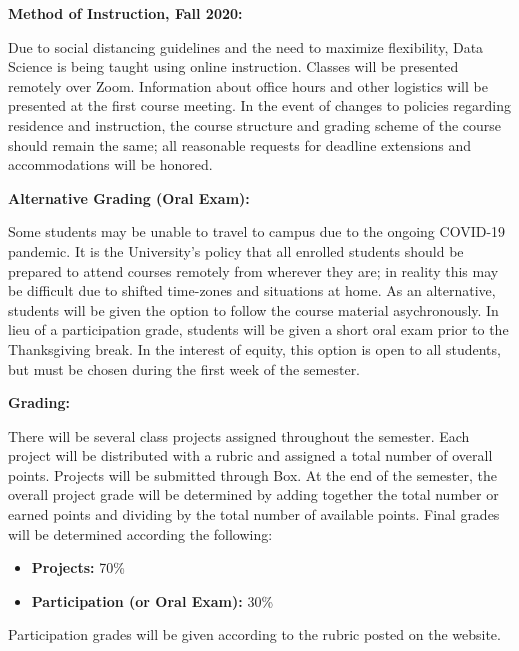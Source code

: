 \documentclass[12pt, a4paper]{article}
\begin{document}
\textbf{Method of Instruction, Fall 2020:} \vspace{6pt}

Due to social distancing guidelines and the need to maximize flexibility, Data Science is
being taught using online instruction. Classes will be presented remotely over Zoom.
Information about office hours and other logistics will be presented at the first course
meeting. In the event of changes to policies regarding residence and instruction, the
course structure and grading scheme of the course should remain the same; all reasonable
requests for deadline extensions and accommodations will be honored.

\bigskip

\textbf{Alternative Grading (Oral Exam):} \vspace{6pt}

Some students may be unable to travel to campus due to the ongoing COVID-19 pandemic. It is
the University's policy that all enrolled students should be prepared to attend courses
remotely from wherever they are; in reality this may be difficult due to shifted
time-zones and situations at home. As an alternative, students will be given the option to
follow the course material asychronously. In lieu of a participation grade, students will
be given a short oral exam prior to the Thanksgiving break. In the interest of equity, this
option is open to all students, but must be chosen during the first week of the semester.

\bigskip

\textbf{Grading:} \vspace{6pt}

There will be several class projects assigned throughout the semester. Each project will be
distributed with a rubric and assigned a total number of overall points. Projects will be
submitted through Box. At the end of the semester, the overall project grade will be
determined by adding together the total number or earned points and dividing by the total
number of available points. Final grades will be determined according the following:

\begin{itemize}\setlength\itemsep{0em}
  \item \textbf{Projects:} 70\%
  \item \textbf{Participation (or Oral Exam):} 30\%
\end{itemize}

Participation grades will be given according to the rubric posted on the website.
\end{document}
